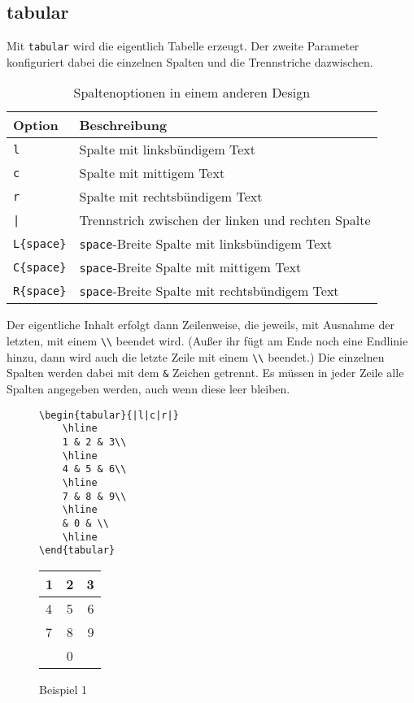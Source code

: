 \subsection{tabular}
Mit \verb|tabular| wird die eigentlich Tabelle erzeugt. Der zweite Parameter konfiguriert dabei die einzelnen Spalten und die Trennstriche dazwischen. 
\begin{table}[ht]
	\centering
	\caption{Spaltenoptionen in einem anderen Design}
	\label{tab:beispieltabelle}
	\begin{tabular}{|l|l|}
		\hline
		\textbf{Option} & \textbf{Beschreibung}\\
		\hline
		\verb|l| & Spalte mit linksbündigem Text\\
		\hline
		\verb|c| & Spalte mit mittigem Text\\
		\hline
		\verb|r| & Spalte mit rechtsbündigem Text\\
		\hline
		\verb=|= & Trennstrich zwischen der linken und rechten Spalte\\
		\hline
		\verb|L{space}| & \verb|space|-Breite Spalte mit linksbündigem Text\\
		\hline
		\verb|C{space}| & \verb|space|-Breite Spalte mit mittigem Text\\
		\hline
		\verb|R{space}| & \verb|space|-Breite Spalte mit rechtsbündigem Text\\
		\hline
	\end{tabular}
\end{table}

Der eigentliche Inhalt erfolgt dann Zeilenweise, die jeweils, mit Ausnahme der letzten, mit einem \verb|\\| beendet wird. (Außer ihr fügt am Ende noch eine Endlinie hinzu, dann wird auch die letzte Zeile mit einem \verb|\\| beendet.) 
Die einzelnen Spalten werden dabei mit dem \verb|&| Zeichen getrennt. Es müssen in jeder Zeile alle Spalten angegeben werden, auch wenn diese leer bleiben. 
\begin{figure}[h] 
	\begin{minipage}[t]{0.47\textwidth} 
		\begin{lstlisting}[style=latex]
\begin{tabular}{|l|c|r|}
	\hline
	1 & 2 & 3\\
	\hline
	4 & 5 & 6\\
	\hline
	7 & 8 & 9\\
	\hline
	& 0 & \\
	\hline
\end{tabular}
\end{lstlisting}
	\end{minipage} 
	\begin{minipage}[t]{0.47\textwidth} 
		\centering
		\caption*{Beispiel 1}
		\begin{tabular}{|l|c|r|}
			\hline
			1 & 2 & 3\\
			\hline
			4 & 5 & 6\\
			\hline
			7 & 8 & 9\\
			\hline
			& 0 & \\
			\hline
		\end{tabular}
	\end{minipage} 
\end{figure} 

